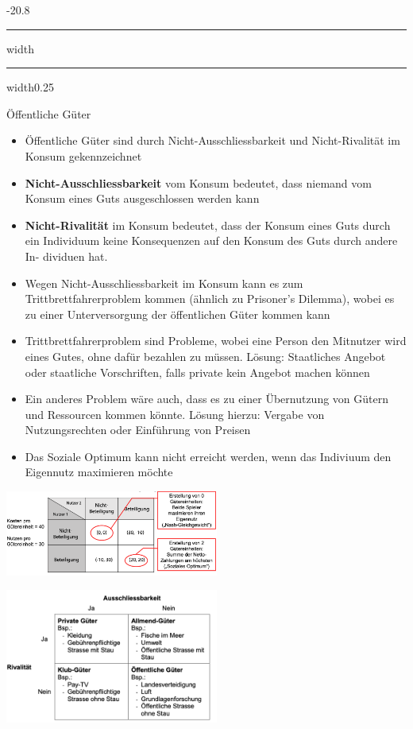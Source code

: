 \documentclass[9pt, landscape, fleqn]{scrartcl}
\makeatletter
\renewcommand{\subsection}{\@startsection{subsection}{1}{0mm}%
{-2\baselineskip}{0.8\baselineskip}%
{\hrule depth 0.2pt width\columnwidth\hrule depth0.75pt
width0.25\columnwidth\vspace*{1.2em}\large\bfseries\rmfamily}}
\makeatother
\begin{document}
\begin{multicols*}{3}
\subsection{Öffentliche Güter}

\begin{itemize}
    \item Öffentliche Güter sind durch Nicht-Ausschliessbarkeit und Nicht-Rivalität im Konsum gekennzeichnet 
    \item \textbf{Nicht-Ausschliessbarkeit} vom Konsum bedeutet, dass niemand vom Konsum eines Guts ausgeschlossen werden kann
    \item \textbf{Nicht-Rivalität} im Konsum bedeutet, dass der Konsum eines Guts durch ein Individuum keine Konsequenzen auf den Konsum des Guts durch andere In- dividuen hat.
    \item Wegen Nicht-Ausschliessbarkeit im Konsum kann es zum Trittbrettfahrerproblem kommen (ähnlich zu Prisoner's Dilemma), wobei es zu einer Unterversorgung der öffentlichen Güter kommen kann
    \item Trittbrettfahrerproblem sind Probleme, wobei eine Person den Mitnutzer wird eines Gutes, ohne dafür bezahlen zu müssen. Lösung: Staatliches Angebot oder staatliche Vorschriften, falls private kein Angebot machen können
    \item Ein anderes Problem wäre auch, dass es zu einer Übernutzung von Gütern und Ressourcen kommen könnte. Lösung hierzu: Vergabe von Nutzungsrechten oder Einführung von Preisen
    \item Das Soziale Optimum kann nicht erreicht werden, wenn das Indiviuum den Eigennutz maximieren möchte 
\end{itemize}

\begin{center}
    \includegraphics[width=7cm]{Oeffentliche_Gueter_Auszahlungsmatrix.png}
\end{center}

\begin{center}
    \includegraphics[width=7cm]{Typen_von_Guetern.png}
\end{center}




\end{multicols*}
\end{document}
